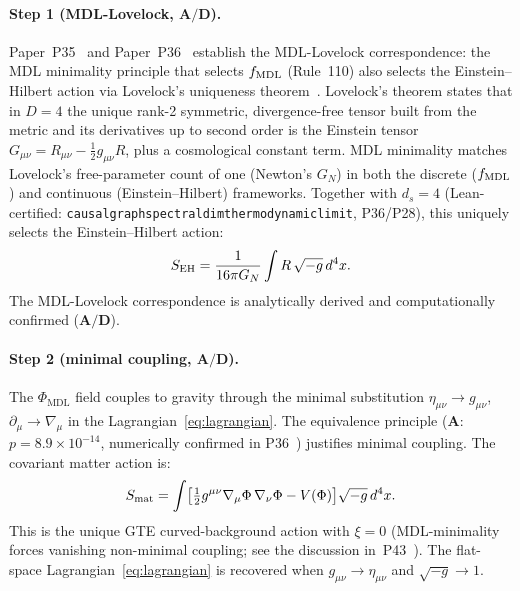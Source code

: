 \documentclass[11pt]{article}
\theoremstyle{remark}
\newcommand{\PHIMDL}{\Phi_{\mathrm{MDL}}}
\newcommand{\lean}[1]{%
  \penalty-100
  \begingroup\def\_{\textunderscore\allowbreak}\texttt{#1}\endgroup}
\newcommand{\fmdl}{f_{\rm MDL}}
\newcommand{\CatA}{\textbf{A}}
\newcommand{\CatAD}{\textbf{A/D}}
\newcommand{\GN}{G_N}
\begin{document}
\paragraph{Step 1 (MDL-Lovelock, $\CatAD$).}
Paper~P35~\cite{SpivackGTEUnification} and Paper~P36~\cite{SpivackEmergentGravity}
establish the MDL-Lovelock correspondence: the MDL minimality principle that selects
$\fmdl$ (Rule~110) also selects the Einstein--Hilbert action via Lovelock's
uniqueness theorem~\cite{Lovelock1971}.
Lovelock's theorem states that in $D=4$ the unique rank-2 symmetric, divergence-free
tensor built from the metric and its derivatives up to second order is the Einstein
tensor $G_{\mu\nu} = R_{\mu\nu} - \tfrac{1}{2}g_{\mu\nu}R$, plus a cosmological
constant term.
MDL minimality matches Lovelock's free-parameter count of one (Newton's $\GN$) in
both the discrete ($f_{\rm MDL}$) and continuous (Einstein--Hilbert) frameworks.
Together with $d_s = 4$ (Lean-certified: \lean{causal\_graph\_spectral\_dim\_thermodynamic\_limit},
P36/P28), this uniquely selects the Einstein--Hilbert action:
\begin{equation}
  S_{\rm EH} = \frac{1}{16\pi\GN}\int R\,\sqrt{-g}\,d^4x.
\label{eq:SEH}
\end{equation}
The MDL-Lovelock correspondence is analytically derived and computationally confirmed ($\CatAD$).

\paragraph{Step 2 (minimal coupling, $\CatAD$).}
The $\PHIMDL$ field couples to gravity through the minimal substitution
$\eta_{\mu\nu} \to g_{\mu\nu}$, $\partial_\mu \to \nabla_\mu$ in the Lagrangian~\eqref{eq:lagrangian}.
The equivalence principle ($\CatA$: $p = 8.9\times10^{-14}$, numerically
confirmed in P36~\cite{SpivackEmergentGravity}) justifies minimal coupling.
The covariant matter action is:
\begin{equation}
  S_{\rm mat} = \int \bigl[\tfrac{1}{2}g^{\mu\nu}\nabla_\mu\Phi\,\nabla_\nu\Phi
  - V(\Phi)\bigr]\sqrt{-g}\,d^4x.
\label{eq:Smat}
\end{equation}
This is the unique GTE curved-background action with $\xi=0$ (MDL-minimality
forces vanishing non-minimal coupling; see the discussion in~P43~\cite{SpivackCompleteness}).
The flat-space Lagrangian~\eqref{eq:lagrangian} is recovered when
$g_{\mu\nu}\to\eta_{\mu\nu}$ and $\sqrt{-g}\to1$.
\end{document}
